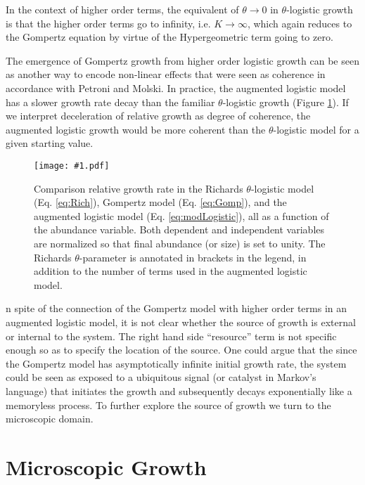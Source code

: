 \documentclass{article}
\newcommand{\insertPdfFig}[3]{
  \begin{figure}[H]
  \centering
  \texttt{[image: \#1.pdf]}
  \caption{#2}
  \label{fig:#1}
  \end{figure}
}
\begin{document}
 In the context of higher order terms, the equivalent of $\theta\rightarrow 0$ in $\theta$-logistic growth is that the higher order terms go to infinity, i.e. $K \rightarrow \infty$, which again reduces to the Gompertz equation by virtue of the Hypergeometric term going to zero. 

 The emergence of Gompertz growth from higher order logistic growth can be seen as another way to encode non-linear effects that were seen as coherence in accordance with Petroni and Molski. In practice, the augmented logistic model has a slower growth rate decay than the familiar $\theta$-logistic growth (Figure \ref{fig:hypergeometric_plain}). If we interpret deceleration of relative growth as degree of coherence, the augmented logistic growth would be more coherent than the $\theta$-logistic model for a given starting value. 

\insertPdfFig{hypergeometric_plain}{Comparison relative growth rate in the Richards $\theta$-logistic model (Eq. \ref{eq:Rich}), Gompertz model (Eq. \ref{eq:Gomp}), and the augmented logistic model (Eq. \ref{eq:modLogistic}), all as a function of the abundance variable. Both dependent and independent variables are normalized so that final abundance (or size) is set to unity. The Richards $\theta$-parameter is annotated in brackets in the legend, in addition to the number of terms used in the augmented logistic model.} 

In spite of the connection of the Gompertz model with higher order terms in an augmented logistic model, it is not clear whether the source of growth is external or internal to the system. The right hand side ``resource'' term is not specific enough so as to specify the location of the source. One could argue that the since the Gompertz model has asymptotically infinite initial growth rate, the system could be seen as exposed to a ubiquitous signal (or catalyst in Markov's language) that initiates the growth and subsequently decays exponentially like a memoryless process. To further explore the source of growth we turn to the microscopic domain.

\section{Microscopic Growth}
\label{sec:micro}
\end{document}
